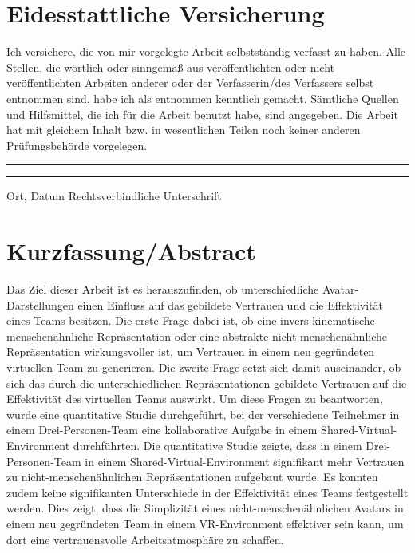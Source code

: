 \documentclass[a4paper,11pt]{article}%
\renewcommand{\\}{\vspace*{0.5\baselineskip} \newline}
\begin{document}
\section*{Eidesstattliche Versicherung}
	Ich versichere, die von mir vorgelegte Arbeit selbstständig verfasst zu haben. Alle Stellen, die wörtlich oder sinngemäß aus veröffentlichten oder nicht veröffentlichten Arbeiten anderer oder der Verfasserin/des Verfassers selbst entnommen sind, habe ich als entnommen kenntlich gemacht. Sämtliche Quellen und Hilfsmittel, die ich für die Arbeit benutzt habe, sind angegeben. Die Arbeit hat mit gleichem Inhalt bzw. in wesentlichen Teilen noch keiner anderen Prüfungsbehörde vorgelegen.\\
	~\\
	~\\
	\rule{0.35\textwidth}{0.4pt} \hspace*{3cm} \rule{0.45\textwidth}{0.4pt} \newline
	Ort, Datum	\hspace*{6.3cm}	Rechtsverbindliche Unterschrift
	\newpage
\section*{Kurzfassung/Abstract}
Das Ziel dieser Arbeit ist es herauszufinden, ob unterschiedliche Avatar-Darstellungen einen Einfluss auf das gebildete Vertrauen und die Effektivität eines Teams besitzen. Die erste Frage dabei ist, ob eine invers-kinematische menschenähnliche Repräsentation oder eine abstrakte nicht-menschenähnliche Repräsentation wirkungsvoller ist, um Vertrauen in einem neu gegründeten virtuellen Team zu generieren. Die zweite Frage setzt sich damit auseinander, ob sich das durch die unterschiedlichen Repräsentationen gebildete Vertrauen auf die Effektivität des virtuellen Teams auswirkt. Um diese Fragen zu beantworten, wurde eine quantitative Studie durchgeführt, bei der verschiedene Teilnehmer in einem Drei-Personen-Team eine kollaborative Aufgabe in einem Shared-Virtual-Environment durchführten. Die quantitative Studie zeigte, dass in einem Drei-Personen-Team in einem Shared-Virtual-Environment signifikant mehr Vertrauen zu nicht-menschenähnlichen Repräsentationen aufgebaut wurde. Es konnten zudem keine signifikanten Unterschiede in der Effektivität eines Teams festgestellt werden. Dies zeigt, dass die Simplizität eines nicht-menschenähnlichen Avatars in einem neu gegründeten Team in einem VR-Environment effektiver sein kann, um dort eine vertrauensvolle Arbeitsatmosphäre zu schaffen. 
	
\end{document}
